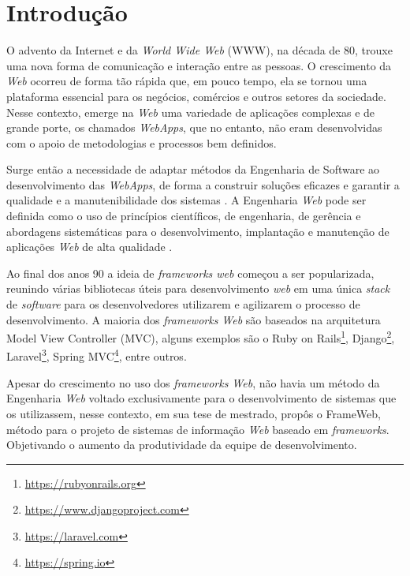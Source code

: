 \chapter{Introdução}
\label{sec-intro}

O advento da Internet e da \textit{World Wide Web} (WWW), na década de 80, trouxe uma nova
forma de comunicação e interação entre as pessoas. O crescimento da \textit{Web} ocorreu de forma tão
rápida que, em pouco tempo, ela se tornou uma plataforma essencial para os negócios, comércios
e outros setores da sociedade. Nesse contexto, emerge na \textit{Web} uma variedade de aplicações
complexas e de grande porte, os chamados \textit{WebApps}, que no entanto, não eram desenvolvidas com o apoio de
metodologias e processos bem definidos.

Surge então a necessidade de adaptar métodos da Engenharia de Software ao desenvolvimento
das \textit{WebApps}, de forma a construir soluções eficazes e garantir a qualidade e a manutenibilidade 
dos sistemas \cite{beder:2017}. A Engenharia \textit{Web} pode ser definida como o uso de 
princípios científicos, de engenharia, de gerência e abordagens sistemáticas para o desenvolvimento,
implantação e manutenção de aplicações \textit{Web} de alta qualidade \cite{murugesan:2001}.

Ao final dos anos 90 a ideia de \textit{frameworks web} começou a ser popularizada, reunindo 
várias bibliotecas úteis para desenvolvimento \textit{web} em uma única \textit{stack} de \textit{software}
para os desenvolvedores utilizarem e agilizarem o processo de desenvolvimento. A maioria dos
\textit{frameworks Web} são baseados na arquitetura Model View Controller (MVC), alguns exemplos
são o Ruby on Rails\footnote{\url{https://rubyonrails.org}}, Django\footnote{\url{https://www.djangoproject.com}}, 
Laravel\footnote{\url{https://laravel.com}}, Spring MVC\footnote{\url{https://spring.io}}, entre outros.

Apesar do crescimento no uso dos \textit{frameworks Web}, não havia um método da Engenharia \textit{Web} 
voltado exclusivamente para o desenvolvimento de sistemas que os utilizassem, nesse contexto, em sua 
tese de mestrado,  propôs o FrameWeb, método para o projeto de sistemas de 
informação \textit{Web} baseado em \textit{frameworks}. Objetivando o aumento da produtividade da 
equipe de desenvolvimento.

